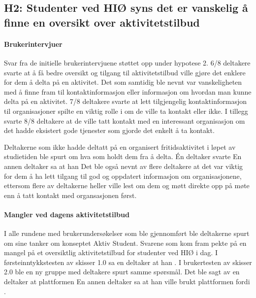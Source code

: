 \subsection{H2: Studenter ved HIØ syns det er vanskelig å finne en oversikt over aktivitetstilbud}

\paragraph{Brukerintervjuer}
Svar fra de initielle brukerintervjuene støttet opp under hypotese 2. 6/8 deltakere svarte at å få bedre oversikt og tilgang til aktivitetstilbud ville gjøre det enklere for dem å delta på en aktivitet. Det som samtidig ble nevnt var vanskeligheten med å finne fram til kontaktinformasjon eller informasjon om hvordan man kunne delta på en aktivitet. 7/8 deltakere svarte at lett tilgjengelig kontaktinformasjon til organisasjoner spilte en viktig rolle i om de ville ta kontakt eller ikke. I tillegg svarte 8/8 deltakere at de ville tatt kontakt med en interessant organisasjon om det hadde eksistert gode tjenester som gjorde det enkelt å ta kontakt.

Deltakerne som ikke hadde deltatt på en organisert fritidsaktivitet i løpet av studietiden ble spurt om hva som holdt dem fra å delta. Én deltaker svarte  En annen deltaker sa at han  Det ble også nevnt av flere deltakere at det var viktig for dem å ha lett tilgang til god og oppdatert informasjon om organisasjonene, ettersom flere av deltakerne heller ville lest om dem og møtt direkte opp på møte enn å tatt kontakt med organsasjonen først.

\paragraph{Mangler ved dagens aktivitetstilbud}
I alle rundene med brukerundersøkelser som ble gjennomført ble deltakerne spurt om sine tanker om konseptet Aktiv Student. Svarene som kom fram pekte på en mangel på et oversiktlig aktivitetstilbud for studenter ved HIØ i dag. I førsteinntykkstesten av skisser 1.0 sa en deltaker at han . I brukertesten av skisser 2.0 ble en ny gruppe med deltakere spurt samme spørsmål. Det ble sagt av en deltaker at plattformen  En annen deltaker sa at han ville brukt plattformen fordi .

